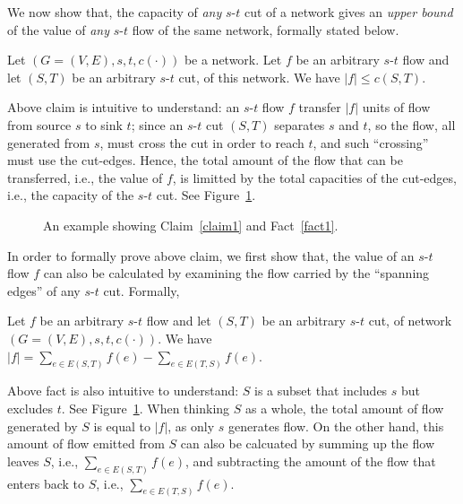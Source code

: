 
We now show that, the capacity of \emph{any} $s$-$t$ cut of a network
gives an \emph{upper bound} of the value of \emph{any} $s$-$t$ flow of the same network, 
formally stated below.
\begin{claim} \label{claim1}
Let $(G=(V, E), s, t, c(\cdot))$ be a network.
Let $f$ be an arbitrary $s$-$t$ flow and let $(S, T)$ be an arbitrary $s$-$t$ cut, of this network.
We have $|f| \le c(S, T)$.
\end{claim}

Above claim is intuitive to understand: an $s$-$t$ flow $f$ transfer $|f|$ units of flow from source $s$ to sink $t$;
since an $s$-$t$ cut $(S, T)$ separates $s$ and $t$, so the flow, all generated from $s$, must cross the cut in order to reach $t$,
and such ``crossing'' must use the cut-edges.
Hence, the total amount of the flow that can be transferred, i.e., the value of $f$, is limitted by
the total capacities of the cut-edges, i.e., the capacity of the $s$-$t$ cut.
See Figure~\ref{fig:claim}.

\begin{figure}[h]
\centering{}
\caption{An example showing Claim~\ref{claim1} and Fact~\ref{fact1}.}
\label{fig:claim}
\end{figure}


In order to formally prove above claim, we first show that, the value of an $s$-$t$ flow $f$
can also be calculated by examining the flow carried by the ``spanning edges'' of any $s$-$t$ cut.
Formally,
\begin{fact} \label{fact1}
Let $f$ be an arbitrary $s$-$t$ flow and let $(S, T)$ be an arbitrary $s$-$t$ cut, of network $(G=(V, E), s, t, c(\cdot))$.
We have $|f| = \sum_{e\in E(S, T)} f(e) - \sum_{e\in E(T, S)} f(e)$.
\end{fact}

Above fact is also intuitive to understand: $S$ is a subset that includes $s$ but excludes $t$.
See Figure~\ref{fig:claim}.
When thinking $S$ as a whole, 
the total amount of flow generated by $S$ is equal to $|f|$, as only $s$ generates flow.
On the other hand, this amount of flow emitted from $S$ 
can also be calcuated by summing up the flow leaves $S$, i.e., $\sum_{e\in E(S, T)} f(e)$,
and subtracting the amount of the flow that enters back to $S$, i.e., $\sum_{e\in E(T, S)} f(e)$.

